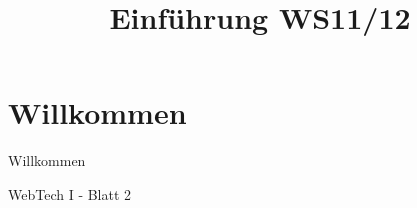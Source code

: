 \documentclass{beamer}
\title{Einführung WS11/12}
\begin{document}
\section{Willkommen}
\begin{frame}{Willkommen}
\begin{center}
\huge
WebTech I - Blatt 2
\vspace{7mm}
\end{center}
\end{frame}






\end{document}

